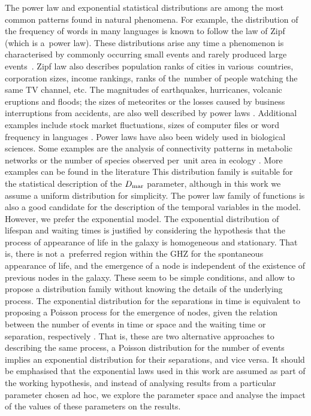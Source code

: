 \documentclass[crop]{CSLB}
\begin{document}
The power law and exponential statistical distributions are among the most
common patterns found in natural phenomena.
%
For example, the distribution of the frequency of words in many languages is
known to follow the law of Zipf (which is a power law).
%
These distributions arise any time a phenomenon is characterised by commonly
occurring small events and rarely produced large events \citep[e.g.
][]{adamic_zipf_2000}.
%
Zipf law also describes population ranks of cities in various countries,
corporation sizes, income rankings, ranks of the number of people watching the
same TV channel, etc.
%
The magnitudes of earthquakes, hurricanes, volcanic eruptions and floods; the
sizes of meteorites or the losses caused by business interruptions from
accidents, are also well described by power laws
\citep{sornette_critical_2006}.
%
%
Additional examples include stock market fluctuations, sizes of computer files
or word frequency in languages \citep{mitzenmacher_brief_2004,
newman_power_2005, simkin_theory_2006}. 
%
Power laws have also been widely used in biological sciences.
%
Some examples are the analysis of connectivity patterns in metabolic networks
\citep{jeong_large_2000} or the number of species observed per unit area in
ecology \citep{martin_origin_2006, frank_common_2009}.
%
More examples can be found in the literature \citep{martin_origin_2006,
maccone_KLT_2010} \citep{barabasi_scale_2009, maccone_evolution_2014}
\citep{maccone_lognormals_2014}
%
This distribution family is suitable for the statistical description
of the $D_{\rm mar}$ parameter, although in this work we assume a uniform
distribution for simplicity.
%
The power law family of functions is also a good candidate for the description of
the temporal variables in the model.
%
However, we prefer the exponential model.
%
The exponential distribution of lifespan and waiting times is justified by
considering the hypothesis that the process of appearance of life in the galaxy
is homogeneous and stationary.
%
That is, there is not a preferred region within
the GHZ for the spontaneous appearance of life, and the emergence of a node is
independent of the existence of previous nodes in the galaxy.
%
These seem to be simple conditions, and allow to propose a distribution family
without knowing the details of the underlying process.
%
The exponential distribution for the separations in time is equivalent to
proposing a Poisson process for the emergence of nodes, given the relation
between the number of events in time or space and the waiting time or
separation, respectively \citep[e.g., ][]{ross_simulation_2012}.
%
That is, these
are two alternative approaches to describing the same process, a Poisson
distribution for the number of events implies an exponential distribution for
their separations, and vice versa.
%
It should be emphasised that the exponential
laws used in this work are assumed as part of the working hypothesis, and
instead of analysing results from a particular parameter chosen ad hoc, we
explore the parameter space and analyse the impact of the values of these
parameters on the results.
\end{document}

